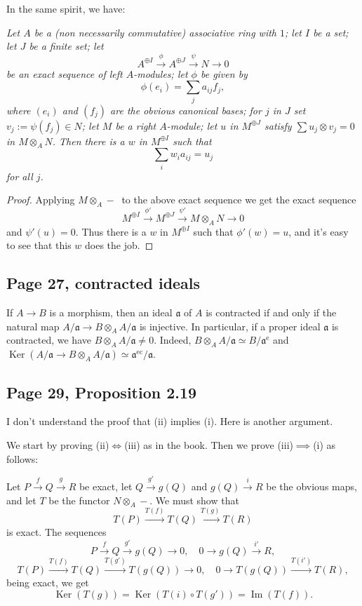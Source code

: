 \documentclass[parskip=half,fontsize=12pt]{scrartcl}%
\newcommand{\oo}{\operatorname}\newcommand{\ooo}{\operatorname*}
\newcommand{\mf}{\mathfrak}
\newcommand{\aaa}{\mf a}
\newcommand{\Ker}{\operatorname{Ker}}\newcommand{\Coker}{\operatorname{Coker}}
\newcommand{\xr}{\xrightarrow}
\begin{document}
In the same spirit, we have:

\emph{Let $A$ be a (non necessarily commutative) associative ring with $1$; let $I$ be a set; let $J$ be a finite set; let 
$$
A^{\oplus I}\xrightarrow\phi A^{\oplus J}\xrightarrow\psi N\to0
$$ 
be an exact sequence of left $A$-modules; let $\phi$ be given by 
$$
\phi(e_i)=\sum_ja_{ij}f_j,
$$ 
where $(e_i)$ and $(f_j)$ are the obvious canonical bases; for $j$ in $J$ set $v_j:=\psi(f_j)\in N$; let $M$ be a right $A$-module; let $u$ in $M^{\oplus J}$ satisfy $\sum u_j\otimes v_j=0$ in $M\otimes_AN$. Then there is a $w$ in $M^{\oplus I}$ such that 
$$
\sum_iw_ia_{ij}=u_j
$$ 
for all $j$.}

\begin{proof} 
Applying $M\otimes_A-\ $ to the above exact sequence we get the exact sequence 
$$
M^{\oplus I}\xrightarrow{\phi'}M^{\oplus J}\xrightarrow{\psi'}M\otimes_AN\to0
$$ 
and $\psi'(u)=0$. Thus there is a $w$ in $M^{\oplus I}$ such that $\phi'(w)=u$, and it's easy to see that this $w$ does the job. 
\end{proof}

\subsection{Page 27, contracted ideals}\label{27}%

If $A\to B$ is a morphism, then an ideal $\aaa$ of $A$ is contracted if and only if the natural map $A/\aaa\to B\otimes_A A/\aaa$ is injective. In particular, if a proper ideal $\aaa$ is contracted, we have $B\otimes_A A/\aaa\ne0$. Indeed, $B\otimes_A A/\aaa\simeq B/\aaa^{\oo e}$ and $\oo{Ker}(A/\aaa\to B\otimes_A A/\aaa)\simeq\aaa^{\oo{ec}}/\aaa$. %

\subsection{Page 29, Proposition 2.19}%

I don't understand the proof that (ii) implies (i). Here is another argument.

We start by proving (ii)$\iff$(iii) as in the book. Then we prove (iii)$\implies$(i) as follows:

Let $P\xr fQ\xr gR$ be exact, let $Q\xr{g'}g(Q)$ and $g(Q)\xr iR$ be the obvious maps, and let $T$ be the functor $N\otimes_A-$. We must show that 
$$
T(P)\xr{T(f)}T(Q)\xr{T(g)}T(R)
$$ 
is exact. The sequences 
$$
P\xr fQ\xr{g'}g(Q)\to0,\quad0\to g(Q)\xr{i'}R,
$$ 
$$
T(P)\xr{T(f)}T(Q)\xr{T(g')}T(g(Q))\to0,\quad0\to T(g(Q))\xr{T(i')}T(R),
$$ 
being exact, we get 
$$
\Ker(T(g))=\Ker(T(i)\circ T(g'))=\oo{Im}(T(f)).
$$
\end{document}
